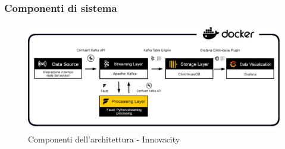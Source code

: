 \subsubsection{Componenti di sistema}
\begin{figure}[H]
    \centering
    \includegraphics[width=1\textwidth]{../Images/SpecificaTecnica/Architettura_PB_microservices2.png}
    \caption{Componenti dell'architettura - Innovacity}
    \label{fig: fdf}
\end{figure}

